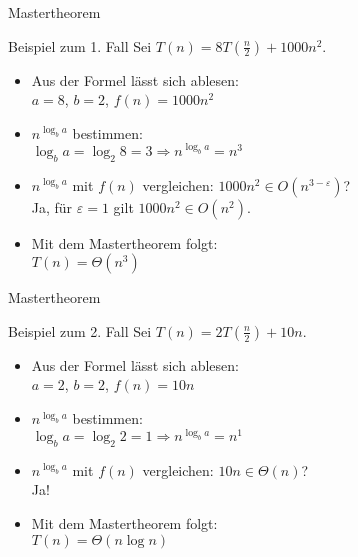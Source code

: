 \begin{frame}{Mastertheorem}
    \begin{exampleblock}{Beispiel zum 1. Fall}
    	Sei $T(n) = 8 T \left(\frac{n}{2} \right) + 1000n^2$.
    	\begin{itemize}
    		\item Aus der Formel lässt sich ablesen:\\
    			$a=8$, $b=2$, $f(n)=1000n^2$
    		\item $n^{\log_b a}$ bestimmen:\\
    			$\log_b a = \log_2 8 = 3 \Rightarrow n^{\log_b a} = n^3$
    		\item $n^{\log_b a}$ mit $f(n)$ vergleichen: $1000n^2 \in O(n^{3-\varepsilon})$?\\
    			Ja, für $\varepsilon = 1$ gilt $1000n^2 \in O(n^2)$.
    		\item Mit dem Mastertheorem folgt:\\
    			$T(n) = \Theta(n^3)$
    	\end{itemize}
    \end{exampleblock}
\end{frame}


\begin{frame}{Mastertheorem}
    \begin{exampleblock}{Beispiel zum 2. Fall}
    	Sei $T(n) = 2 T \left(\frac{n}{2} \right) + 10n$.
    	\begin{itemize}
    		\item Aus der Formel lässt sich ablesen:\\
    			$a=2$, $b=2$, $f(n)=10n$
    		\item $n^{\log_b a}$ bestimmen:\\
    			$\log_b a = \log_2 2 = 1 \Rightarrow n^{\log_b a} = n^1$
    		\item $n^{\log_b a}$ mit $f(n)$ vergleichen: $10n \in \Theta(n)$?\\
    			Ja!
    		\item Mit dem Mastertheorem folgt:\\
    			$T(n) = \Theta(n \log n)$
    	\end{itemize}
    \end{exampleblock}
\end{frame}



